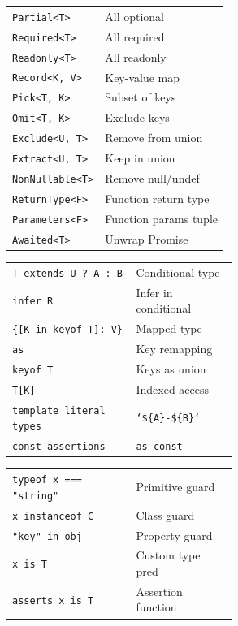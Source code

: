 \documentclass[10pt]{extarticle}
\begin{document}
\begin{multicols}{2}
\begin{tabularx}{\linewidth}{@{}l@{\enspace}Y@{}}
\texttt{Partial<T>}                  & All optional \\
\texttt{Required<T>}                 & All required \\
\texttt{Readonly<T>}                 & All readonly \\
\texttt{Record<K, V>}               & Key-value map \\
\texttt{Pick<T, K>}                 & Subset of keys \\
\texttt{Omit<T, K>}                 & Exclude keys \\
\texttt{Exclude<U, T>}              & Remove from union \\
\texttt{Extract<U, T>}              & Keep in union \\
\texttt{NonNullable<T>}             & Remove null/undef \\
\texttt{ReturnType<F>}              & Function return type \\
\texttt{Parameters<F>}              & Function params tuple \\
\texttt{Awaited<T>}                  & Unwrap Promise \\
\end{tabularx}

\begin{tabularx}{\linewidth}{@{}>{\raggedright\arraybackslash}p{0.55\linewidth}@{\enspace}Y@{}}
\texttt{T extends U ? A : B}        & Conditional type \\
\texttt{infer R}                     & Infer in conditional \\
\texttt{\{[K in keyof T]: V\}}     & Mapped type \\
\texttt{as}                          & Key remapping \\
\texttt{keyof T}                     & Keys as union \\
\texttt{T[K]}                        & Indexed access \\
\texttt{template literal types}     & \texttt{`\$\{A\}-\$\{B\}`} \\
\texttt{const assertions}            & \texttt{as const} \\
\end{tabularx}

\begin{tabularx}{\linewidth}{@{}>{\raggedright\arraybackslash}p{0.55\linewidth}@{\enspace}Y@{}}
\texttt{typeof x === "string"}      & Primitive guard \\
\texttt{x instanceof C}              & Class guard \\
\texttt{"key" in obj}                & Property guard \\
\texttt{x is T}                      & Custom type pred \\
\texttt{asserts x is T}              & Assertion function \\
\end{tabularx}


\end{multicols}
\end{document}
